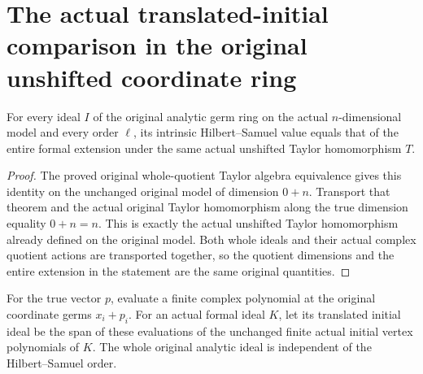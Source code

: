 \section{The actual translated-initial comparison in the original unshifted coordinate ring}

\begin{theorem}
\label{hir:actual-unshifted-original-formal-hs-transfer}
\leanok
For every ideal $I$ of the original analytic germ ring on the actual
$n$-dimensional model and every order $\ell$, its intrinsic Hilbert--Samuel
value equals that of the entire formal extension under the same actual
unshifted Taylor homomorphism $T$.
\end{theorem}
\begin{proof}
The proved original whole-quotient Taylor algebra equivalence gives this
identity on the unchanged original model of dimension $0+n$. Transport
that theorem and the actual original Taylor homomorphism along the true
dimension equality $0+n=n$. This is exactly the actual unshifted Taylor
homomorphism already defined on the original model. Both whole ideals
and their actual complex quotient actions are transported together, so
the quotient dimensions and the entire extension in the statement are
the same original quantities.
\end{proof}

\begin{definition}
\label{hir:actual-unshifted-translated-initial-ideal}
\leanok
For the true vector $p$, evaluate a finite complex polynomial at the
original coordinate germs $x_i+p_i$. For an actual formal ideal $K$,
let its translated initial ideal be the span of these evaluations of the
unchanged finite actual initial vertex polynomials of $K$. The whole
original analytic ideal is independent of the Hilbert--Samuel order.
\end{definition}

